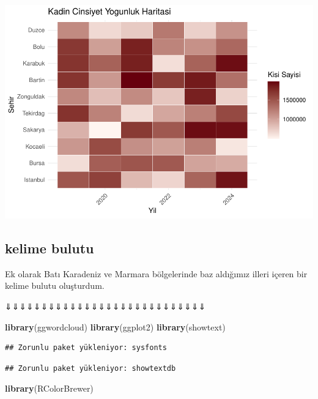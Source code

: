 \documentclass[
]{article}
\newenvironment{Shaded}{\begin{snugshade}}{\end{snugshade}}
\newcommand{\FunctionTok}[1]{\textcolor[rgb]{0.13,0.29,0.53}{\textbf{#1}}}
\newcommand{\NormalTok}[1]{#1}
\begin{document}
\includegraphics{cigdem_ucar_Rmarkdown_odevi_files/figure-latex/unnamed-chunk-16-1.pdf}

\subsection{kelime bulutu}\label{kelime-bulutu}

Ek olarak Batı Karadeniz ve Marmara bölgelerinde baz aldığımız illeri
içeren bir kelime bulutu oluşturdum.

⇓⇓⇓⇓⇓⇓⇓⇓⇓⇓⇓⇓⇓⇓⇓⇓⇓⇓⇓⇓⇓⇓⇓⇓⇓⇓⇓⇓

\begin{Shaded}
\begin{Highlighting}[]
\FunctionTok{library}\NormalTok{(ggwordcloud)}
\FunctionTok{library}\NormalTok{(ggplot2)}
\FunctionTok{library}\NormalTok{(showtext)}
\end{Highlighting}
\end{Shaded}

\begin{verbatim}
## Zorunlu paket yükleniyor: sysfonts
\end{verbatim}

\begin{verbatim}
## Zorunlu paket yükleniyor: showtextdb
\end{verbatim}

\begin{Shaded}
\begin{Highlighting}[]
\FunctionTok{library}\NormalTok{(RColorBrewer)}
\end{Highlighting}
\end{Shaded}
\end{document}
